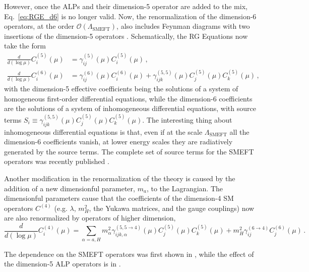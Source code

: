 \documentclass[combined.tex]{subfiles}
\begin{document}
However, once the ALPs and their dimension-5 operator are added to the mix, Eq.~\eqref{eq:RGE_d6} is no longer valid.  Now, the renormalization of the dimension-6 operators, at the order $\mathcal{O}(\Lambda_\mathrm{SMEFT})$, also includes Feynman diagrams with two insertions of the dimension-5 operators \cite{Manohar:2018aog}. Schematically, the RG Equations now take the form
\begin{align}
\frac{d}{d(\log \mu)}C^{(5)}_i(\mu) &= \gamma^{(5)}_{ij}(\mu)C^{(5)}_i(\mu)\,, \nonumber\\
\frac{d}{d(\log \mu)}C^{(6)}_i(\mu) &= \gamma^{(6)}_{ij}(\mu)C^{(6)}_i(\mu) + \gamma_{ijk}^{(5,5)}(\mu) C_j^{(5)}(\mu) C_k^{(5)}(\mu) \,,
\end{align}
with the dimension-5 effective coefficients being the solutions of a system of homogeneous first-order differential equations, while the dimension-6 coefficients are the solutions of a system of inhomogeneous differential equations, with source terms $S_i \equiv \gamma_{ijk}^{(5,5)}(\mu) C_j^{(5)}(\mu) C_k^{(5)}(\mu)$. The interesting thing about inhomogeneous differential equations is that, even if at the scale $\Lambda_\mathrm{SMEFT}$ all the dimension-6 coefficients vanish, at lower energy scales they are radiatively generated by the source terms. The complete set of source terms for the SMEFT operators was recently published \cite{Galda:2021hbr}.

Another modification in the renormalization of the theory is caused by the addition of a new dimensionful parameter, $m_a$, to the Lagrangian. The dimensionful parameters cause  that the coefficients of the dimension-4 SM operators $C^{(4)}$ (e.g. $\lambda$, $m_H^2$, the Yukawa matrices, and the gauge couplings) now are also renormalized by operators of higher dimension,
\begin{equation}
\frac{d}{d(\log\mu)} C^{(4)}_i (\mu) = \sum_{\alpha = a, H} m_\alpha^2 \gamma_{ijk,\alpha}^{(5,5\to4)}(\mu) C_j^{(5)}(\mu) C_k^{(5)}(\mu) + m_H^2 \gamma_{ij}^{(6\to4)} C_j^{(6)}(\mu)\,.
\end{equation}

The dependence on the SMEFT operators was first shown in \cite{Jenkins:2013zja}, while the effect of the dimension-5 ALP operators is in \cite{Galda:2021hbr}.
\end{document}
